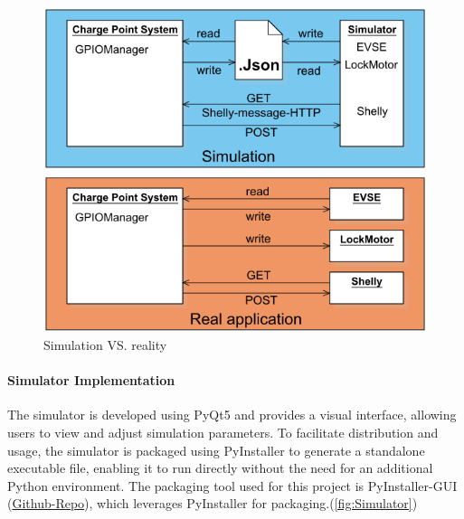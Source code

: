 \documentclass[
english,
ruledheaders=section,%
class=report,%
thesis={type=Report},%
accentcolor=9c,%
custommargins=true,%
marginpar=false,%
parskip=half-,%
fontsize=11pt,%
logofile={img/tuda_logo.pdf}, %
]{tudapub}
\begin{document}
        \begin{figure}[H]
            \centering
            \includegraphics[width=0.66\linewidth]{img/Simulation.png}
            \caption{Simulation VS. reality}
            \label{fig:SimulationFrame}
        \end{figure}




        \paragraph{Simulator Implementation}
        The simulator is developed using PyQt5 and provides a visual interface, allowing users to view and adjust simulation parameters. To facilitate distribution and usage, the simulator is packaged using PyInstaller to generate a standalone executable file, enabling it to run directly without the need for an additional Python environment. The packaging tool used for this project is PyInstaller-GUI (\href{https://github.com/Jf-JIN/Pyinstaller-GUI/releases/tag/v4.0.1}{Github-Repo}), which leverages PyInstaller for packaging.(\autoref{fig:Simulator})
\end{document}
